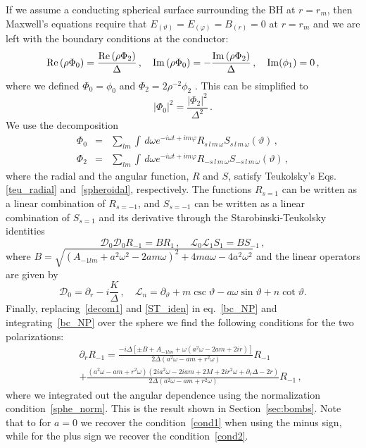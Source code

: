 \documentclass[11pt]{article}
\newcommand{\be}{\begin{equation}}
\newcommand{\ee}{\end{equation}}
\def\beq{\begin{eqnarray}}
\def\eeq{\end{eqnarray}}
\numberwithin{equation}{section} %
\begin{document}
If we assume a conducting spherical surface surrounding the BH at $r=r_m$, then Maxwell's equations require that
$E_{(\vartheta)}=E_{(\varphi)}=B_{(r)}=0$ at $r=r_m$ and we are left with the boundary conditions at the conductor:
%
\be
{\rm Re}\left(\rho\Phi_0\right)=\frac{{\rm Re}\left(\rho\Phi_2\right)}{\Delta}\,,\quad
%
{\rm Im}\left(\rho\Phi_0\right)=-\frac{{\rm Im}\left(\rho\Phi_2\right)}{\Delta}\,,\quad
%
{\rm Im}(\phi_1)=0\,,
\ee
%
where we defined $\Phi_0=\phi_0$ and $\Phi_2=2\rho^{-2}\phi_2$ . This can be simplified to
%
\be\label{bc_NP}
|\Phi_0|^2=\frac{|\Phi_2|^2}{\Delta^2}\,.
\ee
%
%
%
%
We use the decomposition
%
\beq\label{decom1}
\Phi_0&=&\sum_{l m}\int \,d\omega e^{-i\omega t+im\varphi}R_{s\,l\,m\,\omega}S_{s\,l\,m\,\omega}(\vartheta)\,,\nonumber\\
%
\Phi_2&=&\sum_{l m}\int \,d\omega e^{-i\omega t+im\varphi}R_{-s\,l\,m\,\omega}S_{-s\,l\,m\,\omega}(\vartheta)\,,
\eeq
%
where the radial and the angular function, $R$ and $S$, satisfy Teukolsky's Eqs.\eqref{teu_radial} and~\eqref{spheroidal}, respectively.
%
The functions $R_{s=1}$ can be written as a linear combination of $R_{s=-1}$, and $S_{s=-1}$ can be written as a linear combination of $S_{s=1}$ and its derivative through the Starobinski-Teukolsky identities~\cite{Teukolsky:1974yv,1973ZhETF..65....3S,Staro2}
%
\be\label{ST_iden}
\mathcal{D}_0\mathcal{D}_0{}R_{-1}=B R_{1}\,,\quad
\mathcal{L}_0\mathcal{L}_1S_{1}=B S_{-1}\,,
\ee
%
where $B=\sqrt{(A_{-1lm}+a^2\omega^2-2am\omega)^2+4ma\omega-4a^2\omega^2}$ and the linear operators are given by
%
\be
\mathcal{D}_0=\partial_r-i\frac{K}{\Delta}\,,\quad
\mathcal{L}_n=\partial_{\vartheta}+m\csc\vartheta-a\omega\sin\vartheta+n\cot\vartheta.
\ee
%
%
%
%
Finally, replacing~\eqref{decom1} and \eqref{ST_iden} in eq.~\eqref{bc_NP} and integrating~\eqref{bc_NP} over the sphere we find the following conditions for the two polarizations:
%
\beq
&&\partial_r R_{-1}=\frac{-i\Delta\left[\pm B+A_{-1lm}+\omega  \left(a^2 \omega -2 a m+2 i
   r\right)\right]}{2 \Delta\left(a^2 \omega -a m+r^2 \omega \right)}R_{-1}\nonumber\\
&&		+\frac{\left(a^2 \omega -a m+r^2 \omega \right) \left(2 i a^2 \omega -2 i a m+2 M+2 i r^2 \omega+ \partial_r\Delta-2  r\right)}{2 \Delta\left(a^2 \omega -a m+r^2 \omega \right)}R_{-1}\,,
\eeq
%
where we integrated out the angular dependence using the normalization condition~\eqref{sphe_norm}. This is the result shown in Section~\ref{sec:bombs}. Note that to for $a=0$ we recover the condition~\eqref{cond1} when using the minus sign, while for the plus sign we recover the condition~\eqref{cond2}. 
\end{document}
